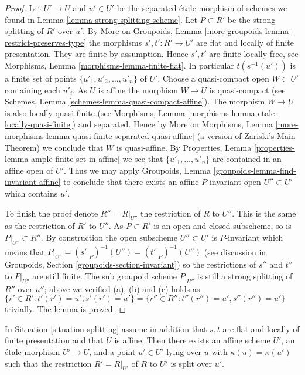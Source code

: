 \begin{proof}
Let $U' \to U$ and $u' \in U'$ be the separated \'etale morphism of schemes
we found in Lemma \ref{lemma-strong-splitting-scheme}.
Let $P \subset R'$ be the strong splitting of $R'$ over $u'$. By
More on Groupoids, Lemma \ref{more-groupoids-lemma-restrict-preserves-type}
the morphisms $s', t' : R' \to U'$ are flat and locally of finite presentation.
They are finite by assumption. Hence $s', t'$ are finite locally
free, see
Morphisms, Lemma \ref{morphisms-lemma-finite-flat}.
In particular $t(s^{-1}(u'))$ is a finite set of points
$\{u'_1, u'_2, \ldots, u'_n\}$ of $U'$. Choose a quasi-compact open
$W \subset U'$ containing each $u'_i$. As $U$ is affine the morphism
$W \to U$ is quasi-compact (see
Schemes, Lemma \ref{schemes-lemma-quasi-compact-affine}).
The morphism $W \to U$ is also locally quasi-finite (see
Morphisms, Lemma \ref{morphisms-lemma-etale-locally-quasi-finite})
and separated. Hence by
More on Morphisms,
Lemma \ref{more-morphisms-lemma-quasi-finite-separated-quasi-affine}
(a version of Zariski's Main Theorem)
we conclude that $W$ is quasi-affine. By
Properties, Lemma \ref{properties-lemma-ample-finite-set-in-affine}
we see that $\{u'_1, \ldots, u'_n\}$ are contained in an affine
open of $U'$. Thus we may apply
Groupoids, Lemma \ref{groupoids-lemma-find-invariant-affine}
to conclude that there exists an affine $P$-invariant open
$U'' \subset U'$ which contains $u'$.

\medskip\noindent
To finish the proof denote $R'' = R|_{U''}$ the restriction of $R$
to $U''$. This is the same as the restriction of $R'$ to $U''$.
As $P \subset R'$ is an open and closed subscheme, so is
$P|_{U''} \subset R''$. By construction the open subscheme $U'' \subset U'$
is $P$-invariant which means that
$P|_{U''} = (s'|_P)^{-1}(U'') = (t'|_P)^{-1}(U'')$
(see discussion in
Groupoids, Section \ref{groupoids-section-invariant})
so the restrictions of $s''$ and $t''$ to $P|_{U''}$ are still finite.
The sub groupoid scheme $P|_{U''}$ is still a strong splitting of
$R''$ over $u''$; above we verified (a), (b) and (c) holds as
$\{r' \in R': t'(r') = u', s'(r') = u'\} =
\{r'' \in R'': t''(r'') = u', s''(r'') = u'\}$ trivially.
The lemma is proved.
\end{proof}

\begin{lemma}
\label{lemma-splitting-affine-scheme}
In Situation \ref{situation-splitting} assume in addition that
$s, t$ are flat and locally of finite presentation and that $U$ is affine.
Then there exists an affine scheme $U'$, an \'etale morphism
$U' \to U$, and a point $u' \in U'$ lying over $u$ with
$\kappa(u) = \kappa(u')$ such that the restriction $R' = R|_{U'}$ of
$R$ to $U'$ is split over $u'$.
\end{lemma}

